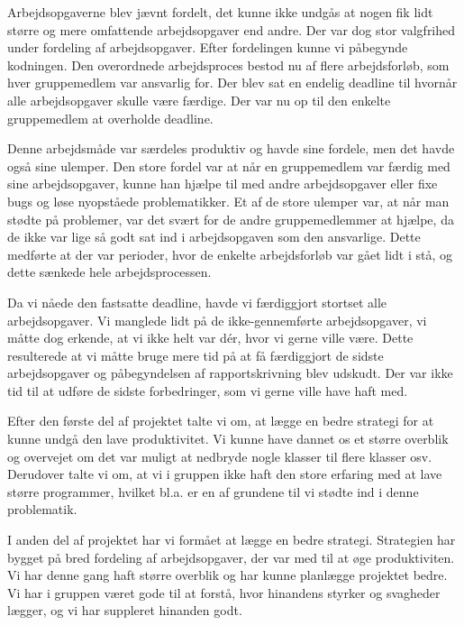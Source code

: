 Arbejdsopgaverne blev jævnt fordelt, det kunne ikke undgås at nogen fik lidt større og mere omfattende arbejdsopgaver end andre. Der var dog stor valgfrihed under fordeling af arbejdsopgaver. Efter fordelingen kunne vi påbegynde kodningen. Den overordnede arbejdsproces bestod nu af flere arbejdsforløb, som hver gruppemedlem var ansvarlig for. Der blev sat en endelig deadline til hvornår alle arbejdsopgaver skulle være færdige. Der var nu op til den enkelte gruppemedlem at overholde deadline. 

Denne arbejdsmåde var særdeles produktiv og havde sine fordele, men det havde også sine ulemper. Den store fordel var at når en gruppemedlem var færdig med sine arbejdsopgaver, kunne han hjælpe til med andre arbejdsopgaver eller fixe bugs og løse nyopståede problematikker. Et af de store ulemper var, at når man stødte på problemer, var det svært for de andre gruppemedlemmer at hjælpe, da de ikke var lige så godt sat ind i arbejdsopgaven som den ansvarlige. Dette medførte at der var perioder, hvor de enkelte arbejdsforløb var gået lidt i stå, og dette sænkede hele arbejdsprocessen. 

Da vi nåede den fastsatte deadline, havde vi færdiggjort stortset alle arbejdsopgaver. Vi manglede lidt på de ikke-gennemførte arbejdsopgaver, vi måtte dog erkende, at vi ikke helt var dér, hvor vi gerne ville være. Dette resulterede at vi måtte bruge mere tid på at få færdiggjort de sidste arbejdsopgaver og påbegyndelsen af rapportskrivning blev udskudt. Der var ikke tid til at udføre de sidste forbedringer, som vi gerne ville have haft med. 

Efter den første del af projektet talte vi om, at lægge en bedre strategi for at kunne undgå den lave produktivitet. Vi kunne have dannet os et større overblik og overvejet om det var muligt at nedbryde nogle klasser til flere klasser osv. Derudover talte vi om, at vi i gruppen ikke haft den store erfaring med at lave større programmer, hvilket bl.a. er en af grundene til  vi stødte ind i denne problematik. 

I anden del af projektet har vi formået at lægge en bedre strategi. Strategien har bygget på bred fordeling af arbejdsopgaver, der var med til at øge produktiviten. Vi har denne gang haft større overblik og har kunne planlægge projektet bedre. Vi har i gruppen været gode til at forstå, hvor hinandens styrker og svagheder lægger, og vi har suppleret hinanden godt. 